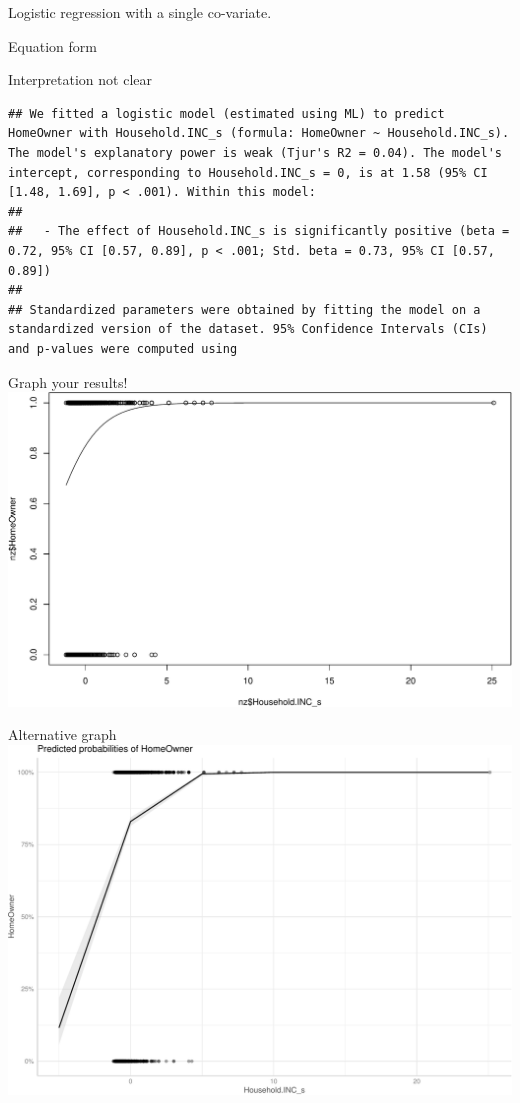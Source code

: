 \documentclass[
  ignorenonframetext,
]{beamer}
\begin{document}
\begin{frame}[fragile]{Logistic regression with a single co-variate.}
\begin{block}{Equation form}
\begin{block}{Interpretation not clear}
\protect\hypertarget{interpretation-not-clear}{}
\begin{verbatim}
## We fitted a logistic model (estimated using ML) to predict HomeOwner with Household.INC_s (formula: HomeOwner ~ Household.INC_s). The model's explanatory power is weak (Tjur's R2 = 0.04). The model's intercept, corresponding to Household.INC_s = 0, is at 1.58 (95% CI [1.48, 1.69], p < .001). Within this model:
## 
##   - The effect of Household.INC_s is significantly positive (beta = 0.72, 95% CI [0.57, 0.89], p < .001; Std. beta = 0.73, 95% CI [0.57, 0.89])
## 
## Standardized parameters were obtained by fitting the model on a standardized version of the dataset. 95% Confidence Intervals (CIs) and p-values were computed using
\end{verbatim}
\end{block}
\end{block}

\begin{block}{Graph your results!}
\protect\hypertarget{graph-your-results}{}
\includegraphics{slides_files/figure-beamer/unnamed-chunk-11-1.pdf}
\end{block}

\begin{block}{Alternative graph}
\protect\hypertarget{alternative-graph}{}
\includegraphics{slides_files/figure-beamer/unnamed-chunk-12-1.pdf}
\end{block}


\end{frame}
\end{document}
